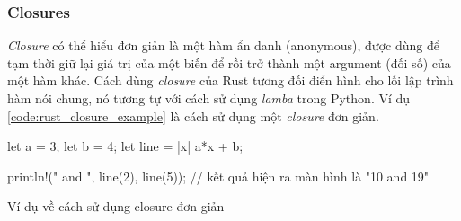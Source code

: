 \subsubsection{Closures}
\emph{Closure} có thể hiểu đơn giản là một hàm ẩn danh (anonymous), được dùng để tạm thời giữ lại giá trị của một biến để rồi trở thành một argument (đối số) của một hàm khác.
Cách dùng \emph{closure} của Rust tương đối điển hình cho lối lập trình hàm nói chung, nó tương tự với cách sử dụng \emph{lamba} trong Python.
Ví dụ \ref{code:rust_closure_example} là cách sử dụng một \emph{closure} đơn giản.
\begin{listing}[H]
\begin{rustcode}
let a = 3;
let b = 4;
let line = |x| a*x + b;

println!("{} and {}", line(2), line(5)); // kết quả hiện ra màn hình là "10 and 19"
\end{rustcode}
\caption{Ví dụ về cách sử dụng closure đơn giản}
\label{code:rust_closure_example}
\end{listing}
